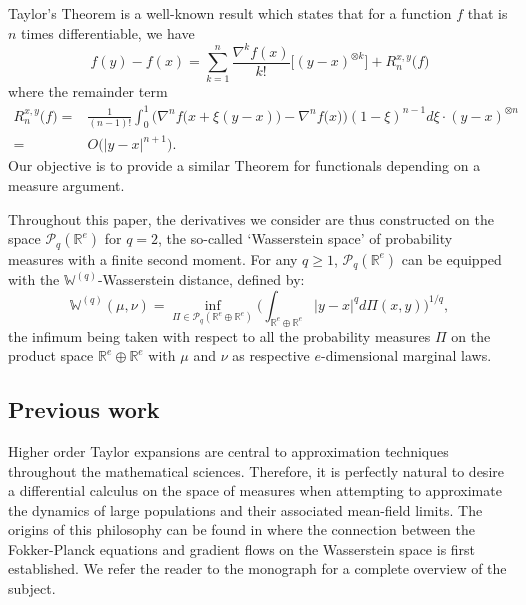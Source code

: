 \documentclass[a4paper,11pt,twoside]{article}
\numberwithin{equation}{section}
\theoremstyle{plain}
\newcommand{\bR}{\mathbb{R}}
\newcommand{\bW}{\mathbb{W}}
\newcommand{\cP}{\mathcal{P}}
\newcommand{\1}{\mathbbm{1}}
\begin{document}
	Taylor's Theorem is a well-known result which states that for a function $f$ that is $n$ times differentiable, we have
	$$
	f(y) - f(x) = \sum_{k=1}^n \frac{\nabla^k f(x)}{k!} \Big[ (y-x)^{\otimes k} \Big] + R_n^{x, y}\big( f \big)
	$$ where the remainder term
	\begin{align*}
		R_n^{x, y}\big( f \big)=& \tfrac{1}{(n-1)!} \int_0^1 \Big( \nabla^n f\big( x + \xi(y-x) \big) - \nabla^n f\big( x \big) \Big) (1-\xi)^{n-1} d\xi \cdot (y-x)^{\otimes n}  
		\\
		=& O\Big( |y-x|^{n+1} \Big).
	\end{align*}
	Our objective is to provide a similar Theorem for functionals depending on a measure argument. 
	
	Throughout this paper, the derivatives we consider are thus constructed on the space $\cP_{q}(\bR^e)$ for $q=2$, the so-called `Wasserstein space' of probability measures with a finite second moment. For any $q \geq 1$, $\cP_q(\bR^e)$ can be equipped with the $\bW^{(q)}$-Wasserstein distance, defined by:
	\begin{equation}
		\label{eq:WassersteinDistance}
		\bW^{(q)}(\mu,\nu) = \inf_{\Pi \in \cP_{q}(\bR^e \oplus \bR^e)}
		\biggl( \int_{\bR^e \oplus \bR^e}
		\big| y-x \big|^q
		d \Pi(x,y) \biggr)^{1/q},
	\end{equation}
	the infimum being taken with respect to all the probability measures $\Pi$ on the product space $\bR^e \oplus \bR^e$ with $\mu$ and $\nu$ as respective $e$-dimensional marginal laws.
	
	\subsection{Previous work}
	
	Higher order Taylor expansions are central to approximation techniques throughout the mathematical sciences. Therefore, it is perfectly natural to desire a differential calculus on the space of measures when attempting to approximate the dynamics of large populations and their associated mean-field limits. The origins of this philosophy can be found in \cite{Jordan1998variation} where the connection between the Fokker-Planck equations and gradient flows on the Wasserstein space is first established. We refer the reader to the monograph \cite{Ambrosio2008Gradient} for a complete overview of the subject. 
	
\end{document}
